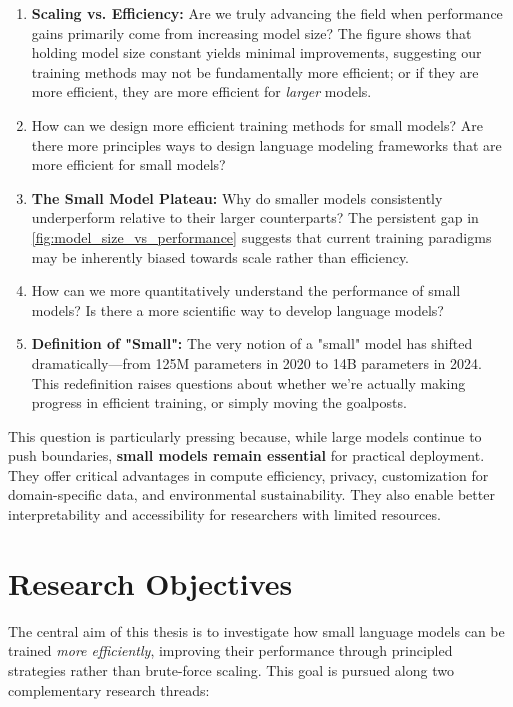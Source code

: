 \begin{enumerate}
    \item \textbf{Scaling vs. Efficiency:} Are we truly advancing the field when performance gains primarily come from increasing model size? The figure shows that holding model size constant yields minimal improvements, suggesting our training methods may not be fundamentally more efficient; or if they are more efficient, they are more efficient for \emph{larger} models.

    \item How can we design more efficient training methods for small models? Are there more principles ways to design language modeling frameworks that are more efficient for small models? 

    \item \textbf{The Small Model Plateau:} Why do smaller models consistently underperform relative to their larger counterparts? The persistent gap in \cref{fig:model_size_vs_performance} suggests that current training paradigms may be inherently biased towards scale rather than efficiency.

    \item How can we more quantitatively understand the performance of small models? Is there a more scientific way to develop language models? 
    
    \item \textbf{Definition of "Small":} The very notion of a "small" model has shifted dramatically—from 125M parameters in 2020 to 14B parameters in 2024. This redefinition raises questions about whether we're actually making progress in efficient training, or simply moving the goalposts.

\end{enumerate}


This question is particularly pressing because, while large models continue to push boundaries, \textbf{small models remain essential} for practical deployment. They offer critical advantages in compute efficiency, privacy, customization for domain-specific data, and environmental sustainability. They also enable better interpretability and accessibility for researchers with limited resources.

\section*{Research Objectives}

The central aim of this thesis is to investigate how small language models can be trained \emph{more efficiently}, improving their performance through principled strategies rather than brute-force scaling. This goal is pursued along two complementary research threads:



